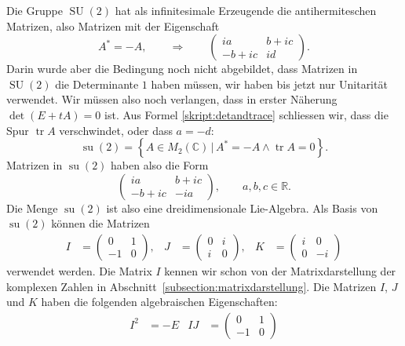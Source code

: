 \begin{beispiel}
Die Gruppe $\operatorname{SU}(2)$ hat als infinitesimale Erzeugende 
die antihermiteschen Matrizen, also Matrizen mit der Eigenschaft
\[
A^*=-A,
\qquad
\Rightarrow
\qquad
\begin{pmatrix}
   ia&b+ic\\
-b+ic&  id
\end{pmatrix}.
\]
Darin wurde aber die Bedingung noch nicht abgebildet, dass Matrizen
in $\operatorname{SU}(2)$ die Determinante $1$ haben müssen, wir
haben bis jetzt nur Unitarität verwendet. Wir müssen also noch
verlangen, dass in erster Näherung $\det(E+tA)=0$ ist.
Aus Formel \eqref{skript:detandtrace} schliessen wir, dass die Spur
$\operatorname{tr}A$ verschwindet, oder dass $a=-d$:
\begin{equation}
\operatorname{su}(2)
=
\left\{ A\in M_2(\mathbb C)\,|\,
A^*=-A\wedge \operatorname{tr}A=0
\right\}.
\end{equation}
Matrizen in $\operatorname{su}(2)$ haben also die Form
\begin{equation}
\begin{pmatrix}
   ia&b+ic\\
-b+ic& -ia
\end{pmatrix},\qquad a,b,c\in\mathbb R.
\end{equation}
Die Menge $\operatorname{su}(2)$ ist also eine dreidimensionale 
Lie-Algebra.
Als Basis von $\operatorname{su}(2)$ können die Matrizen
\begin{align}
I
&=
\begin{pmatrix} 0&1 \\ -1& 0 \end{pmatrix},
&
J
&=
\begin{pmatrix} 0&i \\  i& 0 \end{pmatrix},
&
K
&=
\begin{pmatrix} i&0 \\  0&-i \end{pmatrix}
\label{skript:komplex:definitionIJK}
\end{align}
verwendet werden.
Die Matrix $I$ kennen wir schon von der Matrixdarstellung der komplexen
Zahlen in Abschnitt~\ref{subsection:matrixdarstellung}.
Die Matrizen $I$, $J$ und $K$ haben die folgenden algebraischen
Eigenschaften:
\begin{align*}
I^2
&=
-E
&
IJ
&=
\begin{pmatrix} 0&1 \\ -1& 0 \end{pmatrix}

\end{align*}
\end{beispiel}
